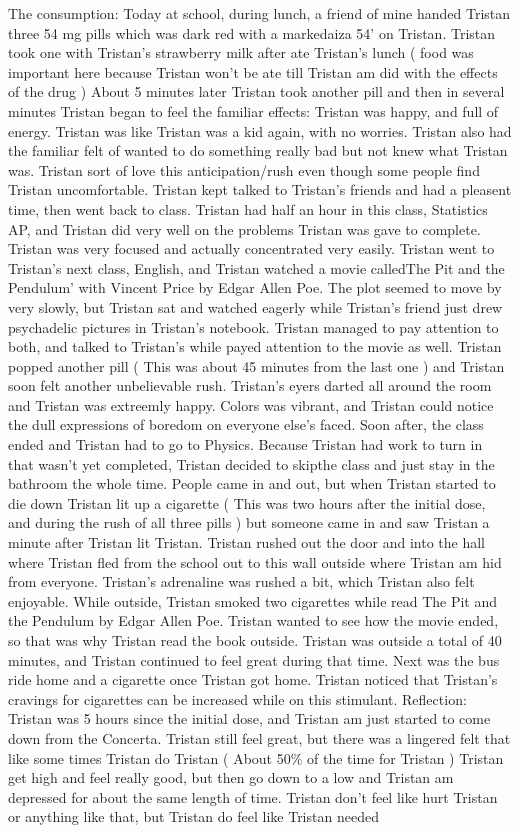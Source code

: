 \documentclass[12pt]{book}
\begin{document}
The consumption: Today at school, during lunch, a friend of mine handed Tristan three 54 mg pills which was dark red with a markedaiza 54' on Tristan. Tristan took one with Tristan's strawberry milk after ate Tristan's lunch ( food was important here because Tristan won't be ate till Tristan am did with the effects of the drug ) About 5 minutes later Tristan took another pill and then in several minutes Tristan began to feel the familiar effects: Tristan was happy, and full of energy. Tristan was like Tristan was a kid again, with no worries. Tristan also had the familiar felt of wanted to do something really bad but not knew what Tristan was. Tristan sort of love this anticipation/rush even though some people find Tristan uncomfortable. Tristan kept talked to Tristan's friends and had a pleasent time, then went back to class. Tristan had half an hour in this class, Statistics AP, and Tristan did very well on the problems Tristan was gave to complete. Tristan was very focused and actually concentrated very easily. Tristan went to Tristan's next class, English, and Tristan watched a movie calledThe Pit and the Pendulum' with Vincent Price by Edgar Allen Poe. The plot seemed to move by very slowly, but Tristan sat and watched eagerly while Tristan's friend just drew psychadelic pictures in Tristan's notebook. Tristan managed to pay attention to both, and talked to Tristan's while payed attention to the movie as well. Tristan popped another pill ( This was about 45 minutes from the last one ) and Tristan soon felt another unbelievable rush. Tristan's eyers darted all around the room and Tristan was extreemly happy. Colors was vibrant, and Tristan could notice the dull expressions of boredom on everyone else's faced. Soon after, the class ended and Tristan had to go to Physics. Because Tristan had work to turn in that wasn't yet completed, Tristan decided to skipthe class and just stay in the bathroom the whole time. People came in and out, but when Tristan started to die down Tristan lit up a cigarette ( This was two hours after the initial dose, and during the rush of all three pills ) but someone came in and saw Tristan a minute after Tristan lit Tristan. Tristan rushed out the door and into the hall where Tristan fled from the school out to this wall outside where Tristan am hid from everyone. Tristan's adrenaline was rushed a bit, which Tristan also felt enjoyable. While outside, Tristan smoked two cigarettes while read The Pit and the Pendulum by Edgar Allen Poe. Tristan wanted to see how the movie ended, so that was why Tristan read the book outside. Tristan was outside a total of 40 minutes, and Tristan continued to feel great during that time. Next was the bus ride home and a cigarette once Tristan got home. Tristan noticed that Tristan's cravings for cigarettes can be increased while on this stimulant. Reflection: Tristan was 5 hours since the initial dose, and Tristan am just started to come down from the Concerta. Tristan still feel great, but there was a lingered felt that like some times Tristan do Tristan ( About 50\% of the time for Tristan ) Tristan get high and feel really good, but then go down to a low and Tristan am depressed for about the same length of time. Tristan don't feel like hurt Tristan or anything like that, but Tristan do feel like Tristan needed 
\end{document}
